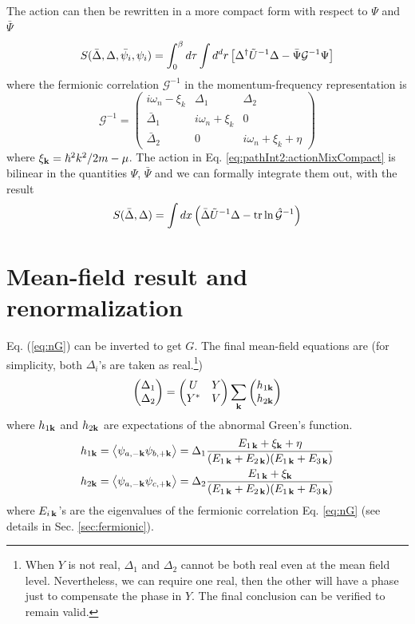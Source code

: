 \documentclass[reprint,pra]{revtex4-1}
\begin{document}
The action can then be rewritten in a more compact form with respect to $\Psi$ and $\bar\Psi$
\begin{equation}\label{eq:pathInt2:actionMixCompact}
S(\bar\Delta,\Delta,\bar\psi_{i},\psi_{i})=\int^{\beta}_{0}d\tau\int{d^{d}r}
	\left[\Delta^{\dagger}\tilde{U}^{-1}\Delta-\bar\Psi\mathcal{G}^{-1}\Psi\right]
\end{equation}
where the fermionic correlation $\mathcal{G}^{-1}$ in the momentum-frequency representation is 
\begin{equation}\label{eq:nG}
\mathcal{G}^{-1}=
\begin{pmatrix}
i\omega_{n}-\xi_{k}&\Delta_{1}&\Delta_{2}\\
\bar\Delta_{1}&i\omega_{n}+\xi_{k}&0\\
\bar\Delta_{2}&0&i\omega_{n}+\xi_{k}+\eta
\end{pmatrix}
\end{equation}
where $\xi_{\mathbf{k}}=\hbar^{2}k^{2}/2m-\mu$. 
The action in Eq. \ref{eq:pathInt2:actionMixCompact} is  bilinear in the quantities $\Psi$, $\bar\Psi$ and we can formally integrate them out, with the result 
\begin{equation}\label{eq:pathInt2:actionD}
S(\bar{\Delta},\Delta)=\int{dx}\left(\bar{\Delta}\tilde{U}^{-1}\Delta-\text{tr}\ln\hat{\mathcal{G}}^{-1}\right)
\end{equation}


\section{Mean-field result and renormalization\label{sec:mean}}
 Eq. (\ref{eq:nG}) can be inverted to get $G$.   The final mean-field equations are (for simplicity,  both $\Delta_{i}$'s are taken as real.\footnote{\label{foot:pathInt2:real}When $Y$ is not real, $\Delta_{1}$ and $\Delta_{2}$ cannot be both real even at the mean field level.  Nevertheless, we can require one  real, then the other will have a phase just to compensate the phase in $Y$.  The final conclusion can be verified to remain valid.   }) 
  \begin{equation}\label{eq:pathInt2:mf}
\begin{pmatrix}\Delta_1\\\Delta_2\end{pmatrix}=\begin{pmatrix}U&Y\\Y^{*}&V\end{pmatrix}\sum_{\mathbf{k}}\begin{pmatrix}h_{1\mathbf{k}}\\h_{2\mathbf{k}}\end{pmatrix}
\end{equation}
  where $ h_{1\mathbf{k}}$ and $ h_{2\mathbf{k}}$ are expectations of the abnormal Green's function.
  \begin{gather}
  h_{1\mathbf{k}}=\bigl<{\psi_{a,-{\mathbf{k}}}\psi_{b,+{\mathbf{k}}}}\bigr>
  =\Delta_{1}\frac{E_{1\,\mathbf{k}}+\xi_{\mathbf{k}}+\eta}{(E_{1\,\mathbf{k}}+E_{2\,\mathbf{k}})(E_{1\,\mathbf{k}}+E_{3\,\mathbf{k}})}\label{eq:pathInt2:h1}\\
  h_{2\mathbf{k}}=\bigl<{\psi_{a,-{\mathbf{k}}}\psi_{c,+{\mathbf{k}}}}\bigr>
  =\Delta_{2}\frac{E_{1\,\mathbf{k}}+\xi_{\mathbf{k}}}{(E_{1\,\mathbf{k}}+E_{2\,\mathbf{k}})(E_{1\,\mathbf{k}}+E_{3\,\mathbf{k}})}\label{eq:pathInt2:h2}
  \end{gather}
   where  $E_{i\,\mathbf{k}}$'s are the eigenvalues of the fermionic correlation Eq. \ref{eq:nG} (see details in Sec. \ref{sec:fermionic}). 
   
\end{document}
